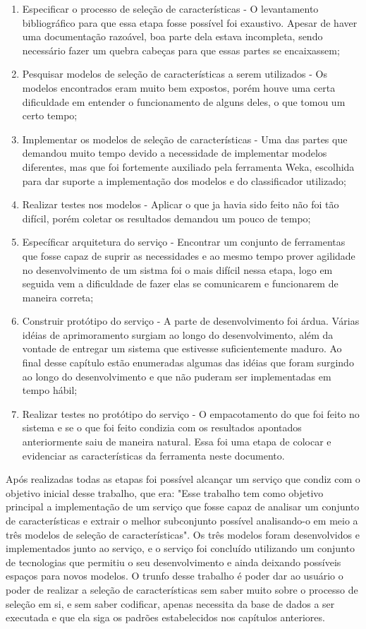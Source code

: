 \begin{enumerate}
	\item{Especificar o processo de seleção de características - O levantamento bibliográfico para que essa etapa fosse possível foi exaustivo. Apesar de haver uma documentação razoável, boa parte dela estava incompleta, sendo necessário fazer um quebra cabeças para que essas partes se encaixassem;}
	\item{Pesquisar modelos de seleção de características a serem utilizados - Os modelos encontrados eram muito bem expostos, porém houve uma certa dificuldade em entender o funcionamento de alguns deles, o que tomou um certo tempo;}
	\item{Implementar os modelos de seleção de características - Uma das partes que demandou muito tempo devido a necessidade de implementar modelos diferentes, mas que foi fortemente auxiliado pela ferramenta Weka, escolhida para dar suporte a implementação dos modelos e do classificador utilizado;}
	\item{Realizar testes nos modelos - Aplicar o que ja havia sido feito não foi tão difícil, porém coletar os resultados demandou um pouco de tempo;}
	\item{Específicar arquitetura do serviço - Encontrar um conjunto de ferramentas que fosse capaz de suprir as necessidades e ao mesmo tempo prover agilidade no desenvolvimento de um sistma foi o mais difícil nessa etapa, logo em seguida vem a dificuldade de fazer elas se comunicarem e funcionarem de maneira correta;}
	\item{Construir protótipo do serviço - A parte de desenvolvimento foi árdua. Várias idéias de aprimoramento surgiam ao longo do desenvolvimento, além da vontade de entregar um sistema que estivesse suficientemente maduro. Ao final desse capítulo estão enumeradas algumas das idéias que foram surgindo ao longo do desenvolvimento e que não puderam ser implementadas em tempo hábil;}
	\item{Realizar testes no protótipo do serviço - O empacotamento do que foi feito no sistema e se o que foi feito condizia com os resultados apontados anteriormente saiu de maneira natural. Essa foi uma etapa de colocar e evidenciar as características da ferramenta neste documento.}
\end{enumerate}

Após realizadas todas as etapas foi possível alcançar um serviço que condiz com o objetivo inicial desse trabalho, que era: "Esse trabalho tem como objetivo principal a implementação de um serviço que fosse capaz de analisar um conjunto de características e extrair o melhor subconjunto possível analisando-o em meio a três modelos de seleção de características". Os três modelos foram desenvolvidos e implementados junto ao serviço, e o serviço foi concluído utilizando um conjunto de tecnologias que permitiu o seu desenvolvimento e ainda deixando possíveis espaços para novos modelos. O trunfo desse trabalho é poder dar ao usuário o poder de realizar a seleção de características sem saber muito sobre o processo de seleção em si, e sem saber codificar, apenas necessita da base de dados a ser executada e que ela siga os padrões estabelecidos nos capítulos anteriores.

